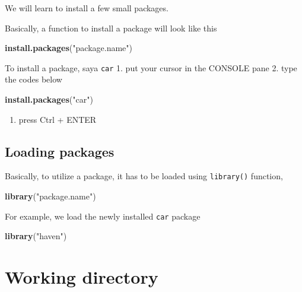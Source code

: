 \documentclass[]{book}
\newenvironment{Shaded}{\begin{snugshade}}{\end{snugshade}}
\newcommand{\KeywordTok}[1]{\textcolor[rgb]{0.13,0.29,0.53}{\textbf{{#1}}}}
\newcommand{\StringTok}[1]{\textcolor[rgb]{0.31,0.60,0.02}{{#1}}}
\newcommand{\NormalTok}[1]{{#1}}
\providecommand{\tightlist}{%
  \setlength{\itemsep}{0pt}\setlength{\parskip}{0pt}}
\theoremstyle{definition}
\theoremstyle{definition}
\theoremstyle{remark}
\begin{document}
We will learn to install a few small packages.

Basically, a function to install a package will look like this

\begin{Shaded}
\begin{Highlighting}[]
\KeywordTok{install.packages}\NormalTok{(}\StringTok{"package.name"}\NormalTok{)}
\end{Highlighting}
\end{Shaded}

To install a package, saya \texttt{car} 1. put your cursor in the
CONSOLE pane 2. type the codes below

\begin{Shaded}
\begin{Highlighting}[]
\KeywordTok{install.packages}\NormalTok{(}\StringTok{"car"}\NormalTok{)}
\end{Highlighting}
\end{Shaded}

\begin{enumerate}
\def\labelenumi{\arabic{enumi}.}
\setcounter{enumi}{2}
\tightlist
\item
  press Ctrl + ENTER
\end{enumerate}

\subsection{Loading packages}\label{loading-packages}

Basically, to utilize a package, it has to be loaded using
\texttt{library()} function,

\begin{Shaded}
\begin{Highlighting}[]
\KeywordTok{library}\NormalTok{(}\StringTok{"package.name"}\NormalTok{)}
\end{Highlighting}
\end{Shaded}

For example, we load the newly installed \texttt{car} package

\begin{Shaded}
\begin{Highlighting}[]
\KeywordTok{library}\NormalTok{(}\StringTok{"haven"}\NormalTok{)}
\end{Highlighting}
\end{Shaded}

\section{Working directory}\label{working-directory}
\end{document}
